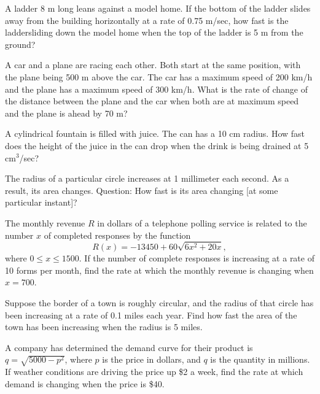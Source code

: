 \documentclass[12pt,letterpaper]{article}
\newenvironment{problem}[2][Problem]{\begin{trivlist}
\item[\hskip \labelsep {\bfseries #1}\hskip \labelsep {\bfseries #2.}]}{\end{trivlist}}
\begin{document}



\begin{problem}{1}
A ladder 8 m long leans against a model home. If the bottom of the ladder slides
away from the building horizontally at a rate of 0.75 m/sec, how fast is the laddersliding down the model home when the top of the ladder is 5 m from the ground?
\end{problem}

\begin{problem}{2}
A car and a plane are racing each other. Both start at the same position, with the plane being 500 m above the car. The car has a maximum speed of 200 km/h
and the plane has a maximum speed of 300 km/h. What is the rate of change of
the distance between the plane and the car when both are at maximum speed
and the plane is ahead by 70 m?
\end{problem}

\begin{problem}{3}
A cylindrical fountain is filled with juice. The can has a 10 cm radius. How fast does the height of the juice in the can drop when the drink is being drained at 5 cm$^3$/sec?
\end{problem}

\begin{problem}{4}
The radius of a particular circle increases at 1 millimeter each second. As a result, its area changes. Question: How fast is its area changing [at some particular instant]? 
\end{problem}

\begin{problem}{5}
  The monthly revenue $R$ in dollars of a telephone polling service is related to the number $x$ of completed responses by the function
  $$
  R(x) = -13450+60\sqrt{6x^2+20x},
  $$
  where $0\leq x\leq 1500$.  If the number of complete responses is increasing at a rate of 10 forms per month, find the rate at which the monthly revenue is changing when $x=700$.
\end{problem}

\begin{problem}{6}
Suppose the border of a town is roughly circular, and the radius of that circle has been increasing at a rate of 0.1 miles each year. Find how fast the area of the town has been increasing when the radius is 5 miles.
\end{problem}

\begin{problem}{7}
A company has determined the demand curve for their product is $q=\sqrt{5000-p^2}$, where $p$ is the price in dollars, and $q$ is the quantity in millions. If weather conditions are driving the price up \$2 a week, find the rate at which demand is changing when the price is \$40.
\end{problem}

\end{document}
